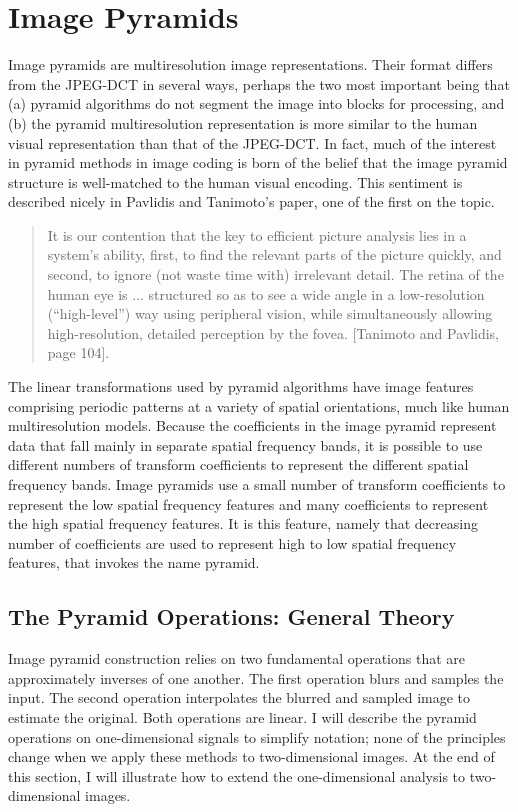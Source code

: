 \section{Image Pyramids}
\label{sec6:pyramid}

Image pyramids are multiresolution image representations.  Their
format differs from the JPEG-DCT in several ways, perhaps the two most
important being that (a) pyramid algorithms do not segment the image into
blocks for processing, and (b) the pyramid multiresolution representation
is more similar to the human visual representation than that of the
JPEG-DCT.  In fact, much of the interest in pyramid methods in image coding
is born of the belief that the image pyramid structure is well-matched
to the human visual encoding.  This sentiment is described nicely in
Pavlidis and Tanimoto's paper, one of the first on the topic.

\begin{quote}
It is our contention that the key to efficient picture analysis lies
in a system's ability, first, to find the relevant parts of the
picture quickly, and second, to ignore (not waste time with)
irrelevant detail.  The retina of the human eye is ... structured so
as to see a wide angle in a low-resolution (``high-level'') way using
peripheral vision, while simultaneously allowing high-resolution,
detailed perception by the fovea.  [Tanimoto and Pavlidis, page 104].
\end{quote}

The linear transformations used by pyramid algorithms have image
features comprising periodic patterns at a variety of spatial
orientations, much like human multiresolution models.  Because the
coefficients in the image pyramid represent data that fall mainly in
separate spatial frequency bands, it is possible to use different
numbers of transform coefficients to represent the different spatial
frequency bands.  Image pyramids use a small number of transform
coefficients to represent the low spatial frequency features and many
coefficients to represent the high spatial frequency features.  It is
this feature, namely that decreasing number of coefficients are used
to represent high to low spatial frequency features, that invokes the
name pyramid.

\subsection*{The Pyramid Operations:  General Theory}
Image pyramid construction relies on two fundamental operations that
are approximately inverses of one another.  The first operation blurs
and samples the input.  The second operation interpolates the blurred
and sampled image to estimate the original.  Both operations are
linear. I will describe the pyramid operations on one-dimensional
signals to simplify notation;  none of the principles change when we apply these methods to
two-dimensional images.  At the
end of this section, I will illustrate how to extend the
one-dimensional analysis to two-dimensional images.

